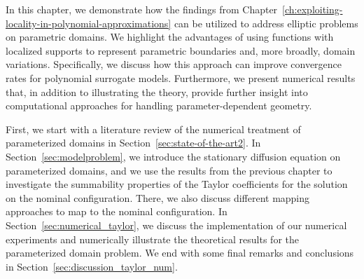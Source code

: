 In this chapter, we demonstrate how the findings from Chapter~\ref{ch:exploiting-locality-in-polynomial-approximations} can be utilized to address elliptic problems on parametric domains.
We highlight the advantages of using functions with localized supports to represent parametric boundaries and, more broadly, domain variations.
Specifically, we discuss how this approach can improve convergence rates for polynomial surrogate models.
Furthermore, we present numerical results that, in addition to illustrating the theory, provide further insight into computational approaches for handling parameter-dependent geometry.

First, we start with a literature review of the numerical treatment of parameterized domains in Section~\ref{sec:state-of-the-art2}.
In Section~\ref{sec:modelproblem}, we introduce the stationary diffusion equation on parameterized domains, and we use the results from the previous chapter to investigate the summability properties of the Taylor coefficients for the solution on the nominal configuration.
There, we also discuss different mapping approaches to map to the nominal configuration.
In Section~\ref{sec:numerical_taylor}, we discuss the implementation of our numerical experiments and numerically illustrate the theoretical results for the parameterized domain problem.
We end with some final remarks and conclusions in Section~\ref{sec:discussion_taylor_num}.